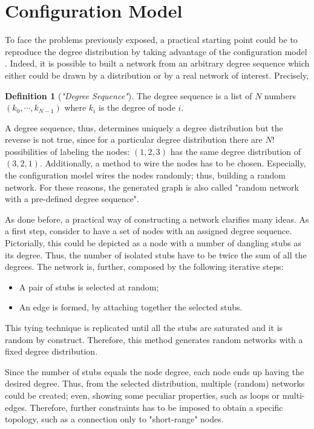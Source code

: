 \documentclass[a4paper,10pt]{book} %
\theoremstyle{definition}
\newtheorem{definition}{Definition}[section]
\begin{document}
\section{Configuration Model}
To face the problems previously exposed, a practical starting point could be to reproduce the degree distribution by taking advantage of the configuration model 
\cite{Menczer:2020_1stCoursNetSci}. Indeed, it is possible to built a network from an arbitrary degree sequence which either could be drawn by a distribution or by a real network of interest.
Precisely,
\begin{definition}[\textit{"Degree Sequence"}]
	The degree sequence is a list of $N$ numbers \newline $(k_0, \cdots, k_{N-1})$ where $k_i$ is the degree of node $i$.
\end{definition}
A degree sequence, thus, determines uniquely a degree distribution but the reverse is not true, since for a particular degree distribution there are $N!$ possibilities of labeling the nodes: $(1,2,3)$ has the same degree distribution of $(3,2,1)$.
Additionally, a method to wire the nodes has to be chosen. Especially, the configuration model wires the nodes randomly; thus, building a random network. For these reasons, the generated graph is also called "random network with a pre-defined degree sequence". 

As done before, a practical way of constructing a network clarifies many ideas.
As a first step, consider to have a set of nodes with an assigned degree sequence. Pictorially, this could be depicted as a node with a number of dangling stubs as its degree. Thus, the number of isolated stubs have to be twice the sum of all the degrees. 
The network is, further, composed by the following iterative steps:
\begin{itemize}
	\item A pair of stubs is selected at random;
	\item An edge is formed, by attaching together the selected stubs. 
\end{itemize}
This tying technique is replicated until all the stubs are saturated and it is random by construct. Therefore, this method generates random networks with a fixed degree distribution.

Since the number of stubs equals the node degree, each node ends up having the desired degree. Thus, from the selected distribution, multiple (random) networks could be created; even, showing some peculiar properties, such as loops or multi-edges. Therefore, further constraints has to be imposed to obtain a specific topology, such as a connection only to "short-range" nodes. 
\end{document}
